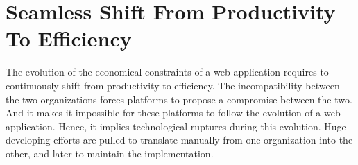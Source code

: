 \chapter{Seamless Shift From Productivity To Efficiency} \label{chapter4}
\minitoc
\eject

The evolution of the economical constraints of a web application requires to continuously shift from productivity to efficiency.
The incompatibility between the two organizations forces platforms to propose a compromise between the two.
And it makes it impossible for these platforms to follow the evolution of a web application.
Hence, it implies technological ruptures during this evolution.
Huge developing efforts are pulled to translate manually from one organization into the other, and later to maintain the implementation. %







